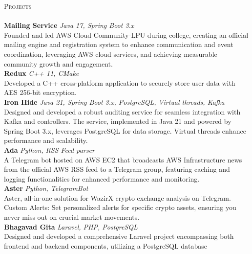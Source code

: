\documentclass[a4paper]{article}
\newcommand{\lineunder} {
    \vspace*{-8pt} \\
    \hspace*{-18pt} \hrulefill \\
}
\newcommand{\header} [1] {
    {\hspace*{-18pt}\vspace*{6pt} \textsc{#1}}
    \vspace*{-6pt} \lineunder
}
\begin{document}
\header{Projects}
{\textbf{Mailing Service}} {\sl Java 17, Spring Boot 3.x} \hfill \href{https://github.com/AWS-Cloud-Community-LPU/mailing-service}{\faGithub}\\
Founded and led AWS Cloud Community-LPU during college, creating an official mailing engine and registration system to enhance communication and event coordination, leveraging AWS cloud services, and achieving measurable community growth and engagement.\\
\vspace*{2mm}
{\textbf{Redux}} {\sl C++ 11, CMake} \hfill \href{https://github.com/garvit-joshi/Redux}{\faGithub}\\
Developed a C++ cross-platform application to securely store user data with AES 256-bit encryption.\\
\vspace*{2mm}
{\textbf{Iron Hide}} {\sl Java 21, Spring Boot 3.x, PostgreSQL, Virtual threads, Kafka} \hfill \href{https://github.com/garvit-joshi/ironhide}{\faGithub}\\
Designed and developed a robust auditing service for seamless integration with Kafka and controllers. The service, implemented in Java 21 and powered by Spring Boot 3.x, leverages PostgreSQL for data storage. Virtual threads enhance performance and scalability.\\
\vspace*{2mm}
{\textbf{Ada}} {\sl Python, RSS Feed parser} \hfill \href{https://github.com/AWS-Cloud-Community-LPU/Ada\_TelegramBot}{\faGithub}\\
A Telegram bot hosted on AWS EC2 that broadcasts AWS Infrastructure news from the official AWS RSS feed to a Telegram group, featuring caching and logging functionalities for enhanced performance and monitoring.\\
\vspace*{2mm}
{\textbf{Aster}} {\sl Python, TelegramBot} \hfill \href{https://github.com/garvit-joshi/Aster_TelegramBot}{\faGithub}\\
Aster, all-in-one solution for WazirX crypto exchange analysis on Telegram.\\
Custom Alerts: Set personalized alerts for specific crypto assets, ensuring you never miss out on crucial market movements.\\
\vspace*{2mm}
{\textbf{Bhagavad Gita}} {\sl Laravel, PHP, PostgreSQL} \hfill \href{https://github.com/garvit-joshi/Bhagavad-Gita}{\faGithub}\\
Designed and developed a comprehensive Laravel project encompassing both frontend and backend components, utilizing a PostgreSQL database\\
\vspace*{2mm}
\ 
\end{document}
